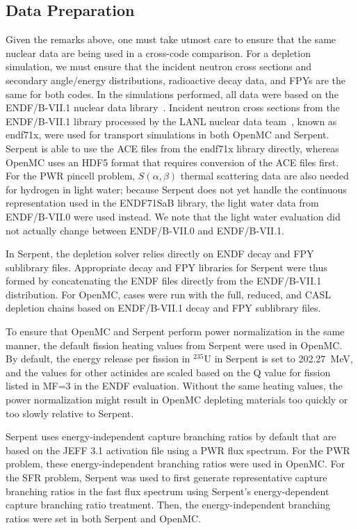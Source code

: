 \documentclass[3p,authoryear]{elsarticle}
\begin{document}
\subsection{Data Preparation}

Given the remarks above, one must take utmost care to ensure that the same
nuclear data are being used in a cross-code comparison. For a depletion
simulation, we must ensure that the incident neutron cross sections and
secondary angle/energy distributions, radioactive decay data, and FPYs are the
same for both codes. In the simulations performed, all data were based on the
ENDF/B-VII.1 nuclear data library~\citep{chadwick2011nds}. Incident neutron
cross sections from the ENDF/B-VII.1 library processed by the LANL nuclear data
team~\citep{conlin2013lanl}, known as endf71x, were used for transport
simulations in both OpenMC and Serpent. Serpent is able to use the ACE files
from the endf71x library directly, whereas OpenMC uses an HDF5 format that
requires conversion of the ACE files first. For the PWR pincell problem,
$S(\alpha,\beta)$ thermal scattering data are also needed for hydrogen in light
water; because Serpent does not yet handle the continuous representation used in
the ENDF71SaB library, the light water data from ENDF/B-VII.0 were used instead.
We note that the light water evaluation did not actually change between
ENDF/B-VII.0 and ENDF/B-VII.1.

In Serpent, the depletion solver relies directly on ENDF decay and FPY
sublibrary files. Appropriate decay and FPY libraries for Serpent were thus
formed by concatenating the ENDF files directly from the ENDF/B-VII.1
distribution. For OpenMC, cases were run with the full, reduced, and CASL
depletion chains based on ENDF/B-VII.1 decay and FPY sublibrary files.

To ensure that OpenMC and Serpent perform power normalization in the same
manner, the default fission heating values from Serpent were used in OpenMC. By
default, the energy release per fission in $^{235}$U in Serpent is set to
\SI{202.27}{\mega\electronvolt}, and the values for other actinides are scaled
based on the Q value for fission listed in MF=3 in the ENDF evaluation. Without
the same heating values, the power normalization might result in OpenMC
depleting materials too quickly or too slowly relative to Serpent.

Serpent uses energy-independent capture branching ratios by default that are
based on the JEFF 3.1 activation file using a PWR flux spectrum. For the PWR
problem, these energy-independent branching ratios were used in OpenMC. For the
SFR problem, Serpent was used to first generate representative capture branching
ratios in the fast flux spectrum using Serpent's energy-dependent capture
branching ratio treatment. Then, the energy-independent branching ratios were
set in both Serpent and OpenMC.
\end{document}

